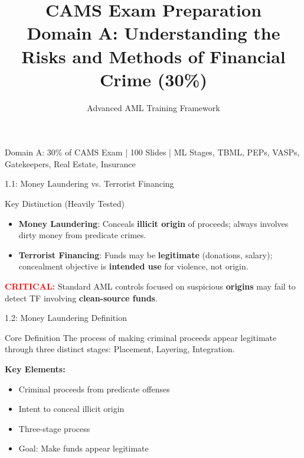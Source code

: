 \documentclass{beamer}
\title[CAMS Domain A]{CAMS Exam Preparation\\Domain A: Understanding the Risks and Methods of Financial Crime (30\%)}
\author{Advanced AML Training Framework}
\date{}
\begin{document}
	
	\begin{frame}
		\titlepage
		\centering
		\tiny Domain A: 30\% of CAMS Exam | 100 Slides | ML Stages, TBML, PEPs, VASPs, Gatekeepers, Real Estate, Insurance
	\end{frame}
	
	
	\begin{frame}{1.1: Money Laundering vs. Terrorist Financing}
		\begin{block}{Key Distinction (Heavily Tested)}
			\begin{itemize}
				\item \textbf{Money Laundering}: Conceals \textbf{illicit origin} of proceeds; always involves dirty money from predicate crimes.
				\item \textbf{Terrorist Financing}: Funds may be \textbf{legitimate} (donations, salary); concealment objective is \textbf{intended use} for violence, not origin.
			\end{itemize}
		\end{block}
		\textcolor{red}{\textbf{CRITICAL:}} Standard AML controls focused on suspicious \textbf{origins} may fail to detect TF involving \textbf{clean-source funds}.
	\end{frame}
	
	\begin{frame}{1.2: Money Laundering Definition}
		\begin{block}{Core Definition}
			The process of making criminal proceeds appear legitimate through three distinct stages: Placement, Layering, Integration.
		\end{block}
		\textbf{Key Elements:}
		\begin{itemize}
			\item Criminal proceeds from predicate offenses
			\item Intent to conceal illicit origin
			\item Three-stage process
			\item Goal: Make funds appear legitimate
		\end{itemize}
	\end{frame}
	
\end{document}
